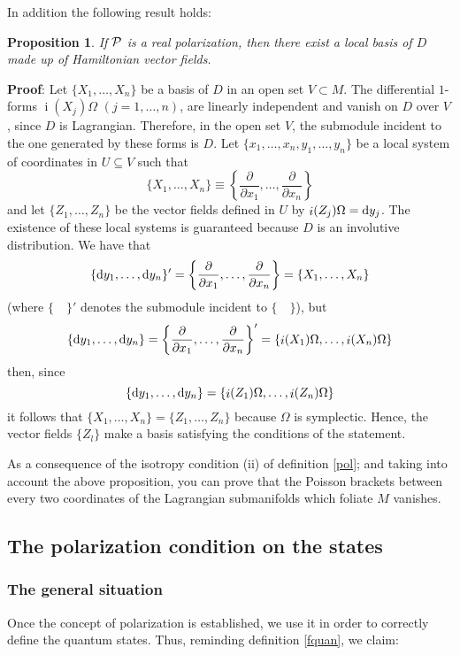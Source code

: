 \documentclass[12pt]{article}
\theoremstyle{plain}
\newtheorem{prop}{Proposition}
\def\derpar#1#2{\frac{\partial{#1}}{\partial{#2}}}
\def\qed{\ifvmode\removelastskip\fi
{\unskip\nobreak\hfil\penalty50\hbox{}\nobreak\hfil
\hbox{\vrule height1.2ex width1.2ex}\parfillskip=0pt
\finalhyphendemerits=0 \par\smallskip}}
\def\d{{\rm d}}
\def\inn{\mathop{i}\nolimits}
\begin{document}
In addition the following result holds:

\begin{prop}
If ${\cal P}$ is a real polarization,
then there exist a local basis of $D$
made up of Hamiltonian vector fields.
\label{blh}
\end{prop}
{\bf Proof}: 
Let $\{ X_1,\ldots ,X_n \}$ be a basis of $D$
in an open set $V \subset M$.
The differential $1$-forms
$\inn(X_j)\Omega$ $(j=1,\ldots ,n)$,
are linearly independent and vanish on $D$ over $V$,
since $D$ is Lagrangian.
Therefore, in the open set $V$, the submodule incident to the one
generated by these forms is $D$.
Let $\{ x_1,\ldots ,x_n,y_1,\ldots ,y_n \}$ be
a local system of coordinates in $U \subseteq V$ such that
$$
\{ X_1,\ldots ,X_n \} \equiv
\left\{ \derpar{}{x_1},\ldots ,\derpar{}{x_n} \right\}
$$
and let $\{ Z_1,\ldots ,Z_n \}$ be
the vector fields defined in $U$ by
$\inn(Z_j)\Omega =\d y_j$.
The existence of these local systems is guaranteed
because $D$ is an involutive distribution.
We have that
$$
\{ \d y_1,\ldots ,\d y_n \}' =
\left\{ \derpar{}{x_1},\ldots ,\derpar{}{x_n} \right\} =
\{ X_1,\ldots ,X_n \}
$$
(where $\{\quad \}'$ denotes the submodule incident to $\{\quad \}$),
but
$$
\{ \d y_1,\ldots ,\d y_n \} =
\left\{ \derpar{}{x_1},\ldots ,\derpar{}{x_n} \right\}' =
\{ \inn(X_1)\Omega ,\ldots ,\inn(X_n)\Omega \}
$$
then, since
$$
\{ \d y_1,\ldots ,\d y_n \} =
\{ \inn(Z_1)\Omega ,\ldots ,\inn(Z_n)\Omega \}
$$
it follows that $\{ X_1,\ldots ,X_n \} = \{ Z_1,\ldots ,Z_n \}$
because $\Omega$ is symplectic.
Hence, the vector fields $\{ Z_l \}$
make a basis satisfying the
conditions of the statement.
\qed

As a consequence of the isotropy condition (ii) of definition
\ref{pol}; and taking into account the above proposition,
you can prove that the Poisson brackets between every two coordinates
of the Lagrangian submanifolds which foliate $M$ vanishes.


\subsection{The polarization condition on the states}


\subsubsection{The general situation}


Once the concept of polarization is established,
we use it in order to correctly define the quantum states.
Thus, reminding definition \ref{fquan}, we claim:
\end{document}
